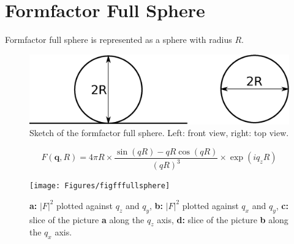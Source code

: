 \section{Formfactor Full Sphere}
Formfactor full sphere is represented as a sphere with radius $R$. 
\begin{figure}[ht]
\begin{center}
\includegraphics[width=0.6\columnwidth]{Figures/fullsphere}
\caption{Sketch of the formfactor full sphere. Left: front view, right: top view.}
\end{center}
\label{fullsphere}
\end{figure}

\begin{equation}
F(\mathbf q, R) = 4\pi R\times\frac{\sin(qR)-qR\cos(qR)}{(qR)^3}\times\exp\left(iq_zR\right)
\end{equation}

\begin{figure}[h]
\begin{center}
\texttt{[image: Figures/figfffullsphere]}
\end{center}
\caption{{\bf a:} $|F|^2$ plotted against $q_z$ and $q_y$, {\bf b:} $|F|^2$ plotted against $q_x$ and $q_y$, {\bf c:} slice of the picture {\bf a} along the $q_z$ axis, {\bf d:} slice of the picture {\bf b} along the $q_x$ axis.}
\end{figure}

\par

